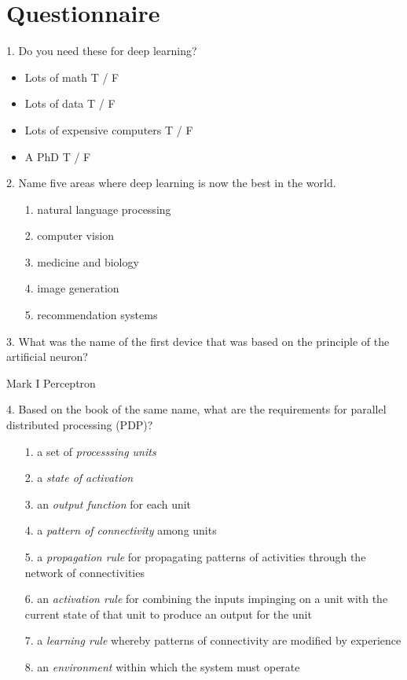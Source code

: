 \documentclass[12pt,a4paper]{article}
\begin{document}
\raggedright

\section*{Questionnaire}

1. Do you need these for deep learning?
\begin{itemize}
	\item Lots of math T / F
	\item Lots of data T / F
	\item Lots of expensive computers T / F
	\item A PhD T / F
\end{itemize}

2. Name five areas where deep learning is now the best in the world. \\

\begin{itemize}
	\item[1.] natural language processing
	\item[2.] computer vision
	\item[3.] medicine and biology
	\item[4.] image generation
	\item[5.] recommendation systems
\end{itemize}

3. What was the name of the first device that was based on the principle of the artificial neuron? \\

\smallbreak

Mark I Perceptron

\bigbreak

4. Based on the book of the same name, what are the requirements for parallel distributed processing (PDP)? \\

\begin{itemize}
	\item[1.] a set of \textit{processsing units}
	\item[2.] a \textit{state of activation}
	\item[3.] an \textit{output function} for each unit
	\item[4.] a \textit{pattern of connectivity} among units
	\item[5.] a \textit{propagation rule} for propagating patterns of activities through the network of connectivities
	\item[6.] an \textit{activation rule} for combining the inputs impinging on a unit with the current state of that unit to produce an output for the unit
	\item[7.] a \textit{learning rule} whereby patterns of connectivity are modified by experience
	\item[8.] an \textit{environment} within which the system must operate
\end{itemize}
\end{document}
